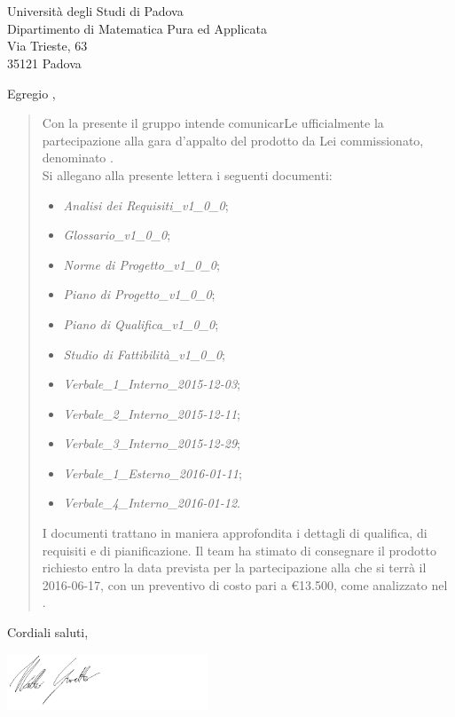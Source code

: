 \documentclass{letter}
\begin{document}

\begin{letter}{\hfill \TV \\
	\hfill \RC \\
	\hfill Università degli Studi di Padova \\
	\hfill Dipartimento di Matematica Pura ed Applicata \\
	\hfill Via Trieste, 63 \\
	\hfill 35121 Padova}

\date{}
\opening{Egregio \TV,}

	\begin{quotation}
		Con la presente il gruppo \textit{\gruppo} intende comunicarLe ufficialmente la partecipazione alla gara d'appalto del prodotto da Lei commissionato, denominato \textbf{\progetto}.
		\\
		Si allegano alla presente lettera i seguenti documenti:
		\begin{itemize}
			\item \textit{Analisi dei Requisiti\_v1\_0\_0};
			\item \textit{Glossario\_v1\_0\_0};
			\item \textit{Norme di Progetto\_v1\_0\_0};
			\item \textit{Piano di Progetto\_v1\_0\_0};
			\item \textit{Piano di Qualifica\_v1\_0\_0};
			\item \textit{Studio di Fattibilità\_v1\_0\_0};
			\item \textit{Verbale\_1\_Interno\_2015-12-03};
			\item \textit{Verbale\_2\_Interno\_2015-12-11};
			\item \textit{Verbale\_3\_Interno\_2015-12-29};
			\item \textit{Verbale\_1\_Esterno\_2016-01-11};
			\item \textit{Verbale\_4\_Interno\_2016-01-12}.
		\end{itemize}
		I documenti trattano in maniera approfondita i dettagli di qualifica, di requisiti e di pianificazione.
		Il team ha stimato di consegnare il prodotto richiesto entro la data prevista per la partecipazione alla \RA{} che si terrà il 2016-06-17, con un preventivo di costo pari a \euro13.500, come analizzato nel \textit{\PdP}.	
	\end{quotation}
	\closing{Cordiali saluti,}
	\includegraphics[keepaspectratio = true, width=6cm]{Firma/MGR.png}


\end{letter}
\end{document}
